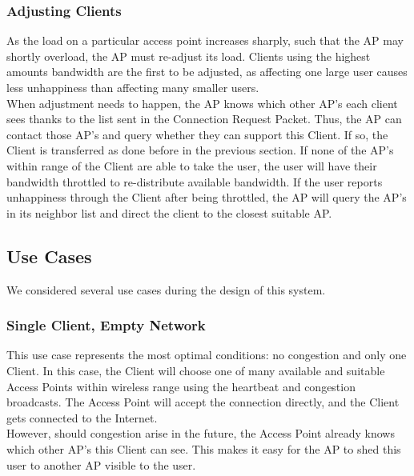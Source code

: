 \documentclass[11pt,twocolumn]{article}
\begin{document}
\subsubsection{Adjusting Clients}
\indent
As the load on a particular access point increases sharply, such that the AP may shortly overload, the AP must re-adjust its load. Clients using the highest amounts 
bandwidth are the first to be adjusted, as affecting one large user causes less unhappiness than affecting many smaller users. \\
\indent
When adjustment needs to happen, the AP knows which other AP's each client sees thanks to the list sent in the Connection 
Request Packet. Thus, the AP can contact those AP's and query whether they can support this Client. If so, the 
Client is transferred as done before in the previous section. If none of the AP's within range of the Client 
are able to take the user, the user will have their bandwidth throttled to re-distribute available bandwidth. If the user 
reports unhappiness through the Client after being throttled, the AP will query the AP's in its neighbor list and direct 
the client to the closest suitable AP.

\subsection{Use Cases}
We considered several use cases during the design of this system.
\subsubsection{Single Client, Empty Network}
\indent This use case represents the most optimal conditions: no congestion and only one Client. In this case, the Client will choose one of many available 
and suitable Access Points within wireless range using the heartbeat and congestion broadcasts. The Access Point will accept the connection directly, and the 
Client gets connected to the Internet.\\
\indent However, should congestion arise in the future, the Access Point already knows which other AP's this Client can see. This makes it easy for the AP to
shed this user to another AP visible to the user.
\end{document}

